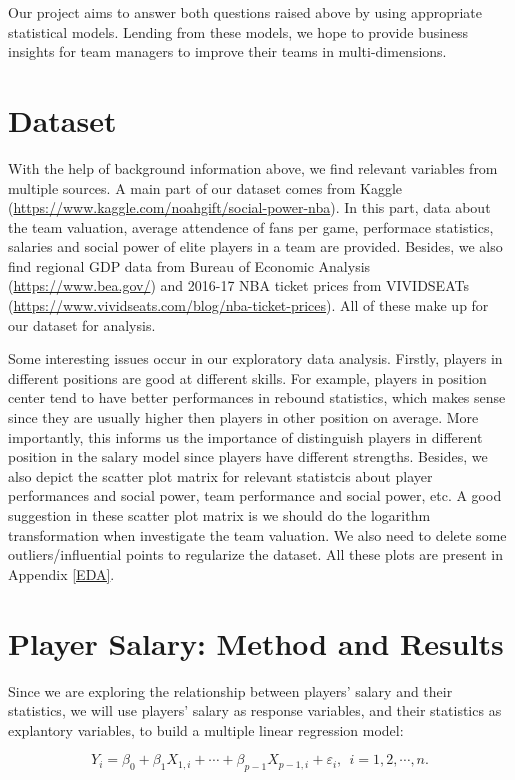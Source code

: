 \documentclass[12pt,]{article}
\begin{document}
Our project aims to answer both questions raised above by using
appropriate statistical models. Lending from these models, we hope to
provide business insights for team managers to improve their teams in
multi-dimensions. \section{Dataset} With the help of background
information above, we find relevant variables from multiple sources. A
main part of our dataset comes from Kaggle
(\url{https://www.kaggle.com/noahgift/social-power-nba}). In this part,
data about the team valuation, average attendence of fans per game,
performace statistics, salaries and social power of elite players in a
team are provided. Besides, we also find regional GDP data from Bureau
of Economic Analysis (\url{https://www.bea.gov/}) and 2016-17 NBA ticket
prices from VIVIDSEATs
(\url{https://www.vividseats.com/blog/nba-ticket-prices}). All of these
make up for our dataset for analysis.

Some interesting issues occur in our exploratory data analysis. Firstly,
players in different positions are good at different skills. For
example, players in position center tend to have better performances in
rebound statistics, which makes sense since they are usually higher then
players in other position on average. More importantly, this informs us
the importance of distinguish players in different position in the
salary model since players have different strengths. Besides, we also
depict the scatter plot matrix for relevant statistcis about player
performances and social power, team performance and social power, etc. A
good suggestion in these scatter plot matrix is we should do the
logarithm transformation when investigate the team valuation. We also
need to delete some outliers/influential points to regularize the
dataset. All these plots are present in Appendix \ref{EDA}.

\section{Player Salary: Method and Results}

Since we are exploring the relationship between players' salary and
their statistics, we will use players' salary as response variables, and
their statistics as explantory variables, to build a multiple linear
regression model:

\begin{equation}\label{MLR}
Y_{i} = \beta_0+\beta_1X_{1,i}+\cdots+\beta_{p-1}X_{p-1,i} + \varepsilon_i,~~i=1,2,\cdots,n.
\end{equation}
\end{document}
